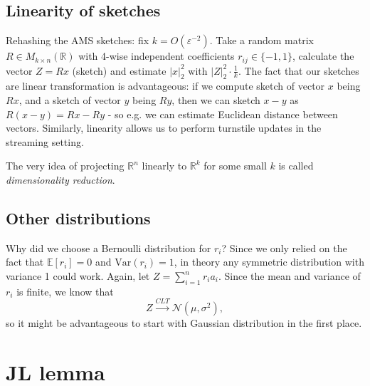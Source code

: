 \documentclass[11pt]{article}
\newcommand{\var}{\mathrm{Var}}
\begin{document}
\subsection{Linearity of sketches}
Rehashing the AMS sketches: fix $k = O(\varepsilon^{-2})$. Take a random matrix $R \in M_{k \times n}(\mathbb{R})$ with 4-wise independent coefficients $r_{ij} \in \{-1, 1\}$, calculate the vector $Z = Rx$ (sketch) and estimate $|x|_2^2$ with $|Z|_2^2 \cdot\frac{1}{k}$. The fact that our sketches are linear transformation is advantageous: if we compute sketch of vector $x$ being $R x$, and a sketch of vector $y$ being $R y$, then we can sketch $x-y$ as $R(x-y) = Rx - Ry$ - so e.g. we can estimate Euclidean distance between vectors. Similarly, linearity allows us to perform turnstile updates in the streaming setting.

The very idea of projecting $\mathbb{R}^n$ linearly to $\mathbb{R}^k$ for some small $k$ is called \emph{dimensionality reduction}.
\subsection{Other distributions}
Why did we choose a Bernoulli distribution for $r_i$? Since we only relied on the fact that $\mathbb{E}[r_i] = 0$ and $\var(r_i)=1$, in theory any symmetric distribution with variance 1 could work.
Again, let $Z = \sum_{i=1}^n r_i a_i$. Since the mean and variance of $r_i$ is finite, we know that
$$ Z \xrightarrow{CLT} \mathcal{N}(\mu, \sigma^2),$$
so it might be advantageous to start with Gaussian distribution in the first place.
\section{JL lemma}
\end{document}
